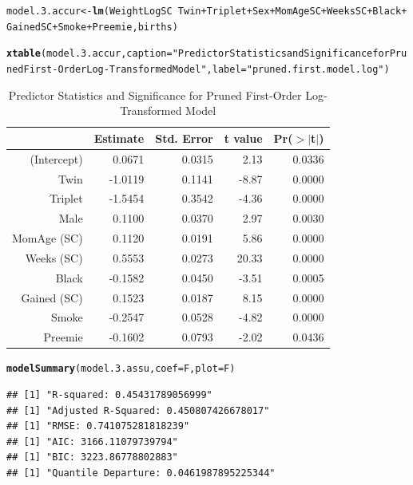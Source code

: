 \documentclass{article}\usepackage[]{graphicx}\usepackage[]{xcolor}
\makeatletter
\newcommand{\hlstr}[1]{\textcolor[rgb]{0.192,0.494,0.8}{#1}}%
\newcommand{\hlopt}[1]{\textcolor[rgb]{0,0,0}{#1}}%
\newcommand{\hlstd}[1]{\textcolor[rgb]{0.345,0.345,0.345}{#1}}%
\newcommand{\hlkwb}[1]{\textcolor[rgb]{0.69,0.353,0.396}{#1}}%
\newcommand{\hlkwc}[1]{\textcolor[rgb]{0.333,0.667,0.333}{#1}}%
\newcommand{\hlkwd}[1]{\textcolor[rgb]{0.737,0.353,0.396}{\textbf{#1}}}%
\newenvironment{kframe}{%
 \def\at@end@of@kframe{}%
 \ifinner\ifhmode%
  \def\at@end@of@kframe{\end{minipage}}%
  \begin{minipage}{\columnwidth}%
 \fi\fi%
 \def\FrameCommand##1{\hskip\@totalleftmargin \hskip-\fboxsep
 \colorbox{shadecolor}{##1}\hskip-\fboxsep
     \hskip-\linewidth \hskip-\@totalleftmargin \hskip\columnwidth}%
 \MakeFramed {\advance\hsize-\width
   \@totalleftmargin\z@ \linewidth\hsize
   \@setminipage}}%
 {\par\unskip\endMakeFramed%
 \at@end@of@kframe}
\newenvironment{knitrout}{}{} %
\makeatother
\begin{document}
\begin{knitrout}
\color{fgcolor}\begin{kframe}
\begin{alltt}
\hlstd{model.3.accur} \hlkwb{<-} \hlkwd{lm}\hlstd{(WeightLogSC} \hlopt{~} \hlstd{Twin} \hlopt{+} \hlstd{Triplet} \hlopt{+} \hlstd{Sex} \hlopt{+} \hlstd{MomAgeSC} \hlopt{+} \hlstd{WeeksSC} \hlopt{+} \hlstd{Black} \hlopt{+}
                      \hlstd{GainedSC} \hlopt{+} \hlstd{Smoke} \hlopt{+} \hlstd{Preemie, births)}

\hlkwd{xtable}\hlstd{(model.3.accur,} \hlkwc{caption}\hlstd{=}\hlstr{"Predictor Statistics and Significance for Pruned First-Order Log-Transformed Model"}\hlstd{,} \hlkwc{label}\hlstd{=}\hlstr{"pruned.first.model.log"}\hlstd{)}
\end{alltt}
\end{kframe}
\end{knitrout}
\begin{table}[H]
\centering
\begin{tabular}{rrrrr}
  \hline
 & Estimate & Std. Error & t value & Pr($>$$|$t$|$) \\ 
  \hline
(Intercept) & 0.0671 & 0.0315 & 2.13 & 0.0336 \\ 
  Twin & -1.0119 & 0.1141 & -8.87 & 0.0000 \\ 
  Triplet & -1.5454 & 0.3542 & -4.36 & 0.0000 \\ 
  Male & 0.1100 & 0.0370 & 2.97 & 0.0030 \\ 
  MomAge (SC) & 0.1120 & 0.0191 & 5.86 & 0.0000 \\ 
  Weeks (SC) & 0.5553 & 0.0273 & 20.33 & 0.0000 \\ 
  Black & -0.1582 & 0.0450 & -3.51 & 0.0005 \\ 
  Gained (SC) & 0.1523 & 0.0187 & 8.15 & 0.0000 \\ 
  Smoke & -0.2547 & 0.0528 & -4.82 & 0.0000 \\ 
  Preemie & -0.1602 & 0.0793 & -2.02 & 0.0436 \\ 
   \hline
\end{tabular}
\caption{Predictor Statistics and Significance for Pruned First-Order Log-Transformed Model} 
\label{pruned.first.model.log}
\end{table}

\begin{knitrout}
\color{fgcolor}\begin{kframe}
\begin{alltt}
\hlkwd{modelSummary}\hlstd{(model.3.assu,} \hlkwc{coef}\hlstd{=F,} \hlkwc{plot}\hlstd{=F)}
\end{alltt}
\begin{verbatim}
## [1] "R-squared: 0.45431789056999"
## [1] "Adjusted R-Squared: 0.450807426678017"
## [1] "RMSE: 0.741075281818239"
## [1] "AIC: 3166.11079739794"
## [1] "BIC: 3223.86778802883"
## [1] "Quantile Departure: 0.0461987895225344"
\end{verbatim}
\end{kframe}
\end{knitrout}
\end{document}
